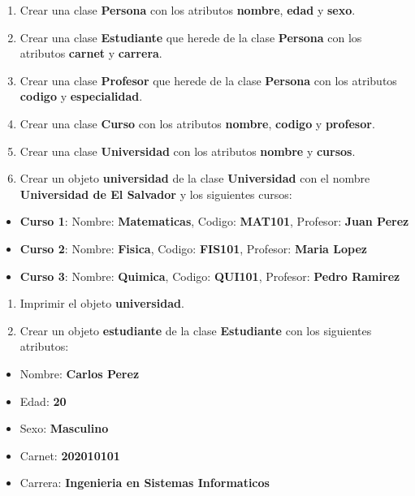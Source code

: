 \documentclass[
  a4paper,
  DIV=11,
  numbers=noendperiod,
  onepage,
  openany]{scrreprt}
\providecommand{\tightlist}{%
  \setlength{\itemsep}{0pt}\setlength{\parskip}{0pt}}\usepackage{longtable,booktabs,array}
\begin{document}
\begin{enumerate}
\def\labelenumi{\arabic{enumi}.}
\item
  Crear una clase \textbf{Persona} con los atributos \textbf{nombre},
  \textbf{edad} y \textbf{sexo}.
\item
  Crear una clase \textbf{Estudiante} que herede de la clase
  \textbf{Persona} con los atributos \textbf{carnet} y \textbf{carrera}.
\item
  Crear una clase \textbf{Profesor} que herede de la clase
  \textbf{Persona} con los atributos \textbf{codigo} y
  \textbf{especialidad}.
\item
  Crear una clase \textbf{Curso} con los atributos \textbf{nombre},
  \textbf{codigo} y \textbf{profesor}.
\item
  Crear una clase \textbf{Universidad} con los atributos \textbf{nombre}
  y \textbf{cursos}.
\item
  Crear un objeto \textbf{universidad} de la clase \textbf{Universidad}
  con el nombre \textbf{Universidad de El Salvador} y los siguientes
  cursos:
\end{enumerate}

\begin{itemize}
\tightlist
\item
  \textbf{Curso 1}: Nombre: \textbf{Matematicas}, Codigo:
  \textbf{MAT101}, Profesor: \textbf{Juan Perez}
\item
  \textbf{Curso 2}: Nombre: \textbf{Fisica}, Codigo: \textbf{FIS101},
  Profesor: \textbf{Maria Lopez}
\item
  \textbf{Curso 3}: Nombre: \textbf{Quimica}, Codigo: \textbf{QUI101},
  Profesor: \textbf{Pedro Ramirez}
\end{itemize}

\begin{enumerate}
\def\labelenumi{\arabic{enumi}.}
\setcounter{enumi}{6}
\item
  Imprimir el objeto \textbf{universidad}.
\item
  Crear un objeto \textbf{estudiante} de la clase \textbf{Estudiante}
  con los siguientes atributos:
\end{enumerate}

\begin{itemize}
\item
  Nombre: \textbf{Carlos Perez}
\item
  Edad: \textbf{20}
\item
  Sexo: \textbf{Masculino}
\item
  Carnet: \textbf{202010101}
\item
  Carrera: \textbf{Ingenieria en Sistemas Informaticos}
\end{itemize}
\end{document}
